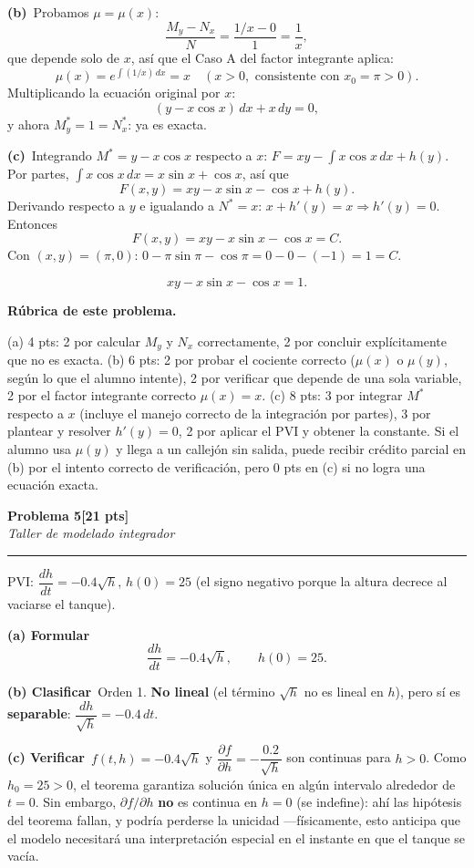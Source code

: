 \documentclass[11pt,letterpaper]{article}
\newcommand{\problema}[3]{%
  \bigskip\bigskip\noindent
  {\Large\textbf{Problema #1}}\hfill\textbf{[#2 pts]}\\[3pt]
  {\small\itshape #3}\par
  \vspace{2pt}\hrule\vspace{8pt}
}
\newcommand{\subparte}[2]{%
  \medskip\noindent\textbf{(#1}\ #2\par\smallskip
}
\newenvironment{resultado}
  {\begin{mdframed}[linecolor=black,linewidth=0.6pt,
    innerleftmargin=6pt,innerrightmargin=6pt,innertopmargin=4pt,innerbottommargin=4pt]
   \bfseries}
  {\end{mdframed}}
\newenvironment{rubrica}{%
  \begin{mdframed}[linecolor=black,linewidth=0.6pt,
    innerleftmargin=8pt,innerrightmargin=8pt,innertopmargin=5pt,innerbottommargin=5pt]
  \small\textbf{Rúbrica de este problema.}\par\smallskip
}{\end{mdframed}}
\begin{document}
\subparte{b)}{Probamos $\mu=\mu(x)$:
\[
\frac{M_y-N_x}{N} = \frac{1/x - 0}{1} = \frac{1}{x},
\]
que depende solo de $x$, así que el Caso A del factor integrante aplica:
\[
\mu(x) = e^{\int (1/x)\,dx} = x \quad (x>0, \text{ consistente con } x_0=\pi>0).
\]
Multiplicando la ecuación original por $x$:
\[
(y-x\cos x)\, dx + x\, dy = 0,
\]
y ahora $M^*_y = 1 = N^*_x$: \checkmark ya es exacta.}

\subparte{c)}{Integrando $M^*=y-x\cos x$ respecto a $x$: $F = xy - \displaystyle\int x\cos x\,dx + h(y)$. Por partes, $\int x\cos x\,dx = x\sin x + \cos x$, así que
\[
F(x,y) = xy - x\sin x - \cos x + h(y).
\]
Derivando respecto a $y$ e igualando a $N^*=x$: $x + h'(y) = x \Rightarrow h'(y)=0$. Entonces
\[
F(x,y) = xy - x\sin x - \cos x = C.
\]
Con $(x,y)=(\pi,0)$: $0 - \pi\sin\pi - \cos\pi = 0-0-(-1) = 1 = C$.
\begin{resultado}
\[
xy - x\sin x - \cos x = 1.
\]
\end{resultado}}

\begin{rubrica}
(a) 4 pts: 2 por calcular $M_y$ y $N_x$ correctamente, 2 por concluir explícitamente que no es exacta. (b) 6 pts: 2 por probar el cociente correcto ($\mu(x)$ o $\mu(y)$, según lo que el alumno intente), 2 por verificar que depende de una sola variable, 2 por el factor integrante correcto $\mu(x)=x$. (c) 8 pts: 3 por integrar $M^*$ respecto a $x$ (incluye el manejo correcto de la integración por partes), 3 por plantear y resolver $h'(y)=0$, 2 por aplicar el PVI y obtener la constante. Si el alumno usa $\mu(y)$ y llega a un callejón sin salida, puede recibir crédito parcial en (b) por el intento correcto de verificación, pero 0 pts en (c) si no logra una ecuación exacta.
\end{rubrica}

\problema{5}{21}{Taller de modelado integrador}

PVI: $\dfrac{dh}{dt} = -0.4\sqrt{h}$, $h(0)=25$ (el signo negativo porque la altura decrece al vaciarse el tanque).

\subparte{a) Formular}{
\[
\frac{dh}{dt} = -0.4\sqrt{h}, \qquad h(0)=25.
\]
}

\subparte{b) Clasificar}{Orden 1. \textbf{No lineal} (el término $\sqrt{h}$ no es lineal en $h$), pero sí es \textbf{separable}: $\dfrac{dh}{\sqrt{h}} = -0.4\,dt$.}

\subparte{c) Verificar}{$f(t,h)=-0.4\sqrt{h}$ y $\dfrac{\partial f}{\partial h} = -\dfrac{0.2}{\sqrt{h}}$ son continuas para $h>0$. Como $h_0=25>0$, el teorema garantiza solución única en algún intervalo alrededor de $t=0$. Sin embargo, $\partial f/\partial h$ \textbf{no} es continua en $h=0$ (se indefine): ahí las hipótesis del teorema fallan, y podría perderse la unicidad —físicamente, esto anticipa que el modelo necesitará una interpretación especial en el instante en que el tanque se vacía.}
\end{document}
